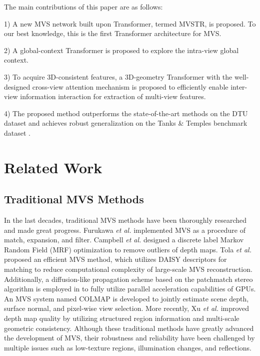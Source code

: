 \documentclass[10pt,twocolumn,letterpaper]{article}
\begin{document}
The main contributions of this paper are as follows:

1) A new MVS network built upon Transformer, termed MVSTR, is proposed. To our best knowledge, this is the first Transformer architecture for MVS. 

2) A global-context Transformer is proposed to explore the intra-view global context.

3) To acquire 3D-consistent features, a 3D-geometry Transformer with the well-designed cross-view attention mechanism is proposed to efficiently enable inter-view information interaction for extraction of multi-view features.

4) The proposed method outperforms the state-of-the-art methods on the DTU dataset \cite{dtu} and achieves robust generalization on the Tanks \& Temples benchmark dataset \cite{t&t}.


\section{Related Work}
\label{sec:formatting}

\subsection{Traditional MVS Methods}

In the last decades, traditional MVS methods have been thoroughly researched and made great progress. Furukawa \textit{et al.} \cite{furu} implemented MVS as a procedure of match, expansion, and filter. Campbell \textit{et al.} \cite{camp} designed a discrete label Markov Random Field (MRF) optimization to remove outliers of depth maps. Tola \textit{et al.} \cite{tola} proposed an efficient MVS method, which utilizes DAISY descriptors for matching to reduce computational complexity of large-scale MVS reconstruction. Additionally, a diffusion-like propagation scheme based on the patchmatch stereo algorithm \cite{patchmatchstereo} is employed in \cite{gipuma} to fully utilize parallel acceleration capabilities of GPUs. An MVS system named COLMAP \cite{colmap} is developed to jointly estimate scene depth, surface normal, and pixel-wise view selection. More recently, Xu \textit{et al.} \cite{acmm} improved depth map quality by utilizing structured region information and multi-scale geometric consistency. Although these traditional methods have greatly advanced the development of MVS, their robustness and reliability have been challenged by multiple issues such as low-texture regions, illumination changes, and reflections.
\end{document}
